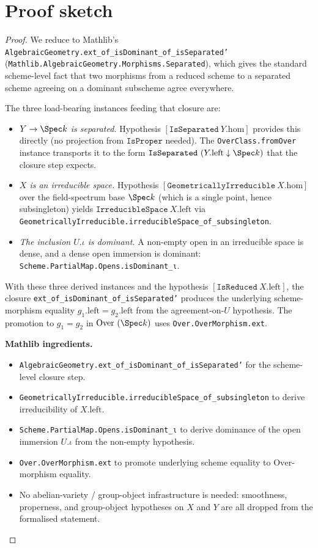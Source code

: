 \section{Proof sketch}

\begin{proof}
  \leanok
  We reduce to Mathlib's \texttt{AlgebraicGeometry.ext\_of\_isDominant\_of\_isSeparated'} (\texttt{Mathlib.AlgebraicGeometry.Morphisms.Separated}), which gives the standard scheme-level fact that two morphisms from a reduced scheme to a separated scheme agreeing on a dominant subscheme agree everywhere.

  The three load-bearing instances feeding that closure are:
  \begin{itemize}
    \item \emph{\(Y \to \Spec k\) is separated.} Hypothesis \([\mathtt{IsSeparated}\ Y.\mathrm{hom}]\) provides this directly (no projection from \(\mathtt{IsProper}\) needed). The \texttt{OverClass.fromOver} instance transports it to the form \(\mathtt{IsSeparated}\ (Y.\mathrm{left} \downarrow \Spec k)\) that the closure step expects.
    \item \emph{\(X\) is an irreducible space.} Hypothesis \([\mathtt{GeometricallyIrreducible}\ X.\mathrm{hom}]\) over the field-spectrum base \(\Spec k\) (which is a single point, hence subsingleton) yields \(\mathtt{IrreducibleSpace}\ X.\mathrm{left}\) via \texttt{GeometricallyIrreducible.irreducibleSpace\_of\_subsingleton}.
    \item \emph{The inclusion \(U.\iota\) is dominant.} A non-empty open in an irreducible space is dense, and a dense open immersion is dominant: \texttt{Scheme.PartialMap.Opens.isDominant\_ι}.
  \end{itemize}
  With these three derived instances and the hypothesis \([\mathtt{IsReduced}\ X.\mathrm{left}]\), the closure \texttt{ext\_of\_isDominant\_of\_isSeparated'} produces the underlying scheme-morphism equality \(g_1.\mathrm{left} = g_2.\mathrm{left}\) from the agreement-on-\(U\) hypothesis. The promotion to \(g_1 = g_2\) in \(\mathrm{Over}\ (\Spec k)\) uses \texttt{Over.OverMorphism.ext}.

  \medskip
  \noindent\textbf{Mathlib ingredients.}
  \begin{itemize}
    \item \texttt{AlgebraicGeometry.ext\_of\_isDominant\_of\_isSeparated'} for the scheme-level closure step.
    \item \texttt{GeometricallyIrreducible.irreducibleSpace\_of\_subsingleton} to derive irreducibility of \(X.\mathrm{left}\).
    \item \texttt{Scheme.PartialMap.Opens.isDominant\_ι} to derive dominance of the open immersion \(U.\iota\) from the non-empty hypothesis.
    \item \texttt{Over.OverMorphism.ext} to promote underlying scheme equality to \(\mathrm{Over}\)-morphism equality.
    \item No abelian-variety / group-object infrastructure is needed: smoothness, properness, and group-object hypotheses on \(X\) and \(Y\) are all dropped from the formalised statement.
  \end{itemize}
\end{proof}

